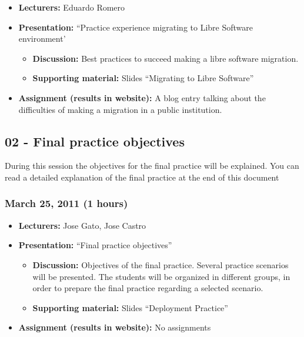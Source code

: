 \documentclass[a4paper]{article}
\begin{document}
\begin{itemize}
\item \textbf{Lecturers:} Eduardo Romero
\item \textbf{Presentation:} ``Practice experience migrating to Libre Software environment'
  \begin{itemize}
  \item \textbf{Discussion:} Best practices to succeed making a libre software migration. 
  \item \textbf{Supporting material:} Slides ``Migrating to Libre Software''
  \end{itemize}
\item \textbf{Assignment (results in website):} A blog entry talking about the difficulties of making a migration in a public institution. 
\end{itemize}

\subsection{02 - Final practice objectives}

During this session the objectives for the final practice will be explained. You can read a detailed explanation of the final practice at the end of this document

\subsubsection{March 25, 2011 (1 hours)}

\begin{itemize}
\item \textbf{Lecturers:} Jose Gato, Jose Castro
\item \textbf{Presentation:} ``Final practice objectives''
  \begin{itemize}
  \item \textbf{Discussion:} Objectives of the final practice. Several practice scenarios will be presented. The students will be organized in different groups, in order to prepare the final practice regarding a selected scenario. 
  \item \textbf{Supporting material:} Slides ``Deployment Practice''
  \end{itemize}
\item \textbf{Assignment (results in website):} No assignments 
\end{itemize}
\end{document}
